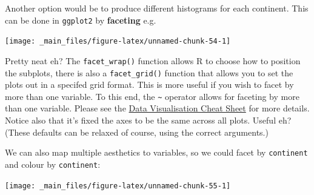 \documentclass[]{book}
\newenvironment{Shaded}{\begin{snugshade}}{\end{snugshade}}
\newcommand{\KeywordTok}[1]{\textcolor[rgb]{0.13,0.29,0.53}{\textbf{{#1}}}}
\newcommand{\DataTypeTok}[1]{\textcolor[rgb]{0.13,0.29,0.53}{{#1}}}
\newcommand{\DecValTok}[1]{\textcolor[rgb]{0.00,0.00,0.81}{{#1}}}
\newcommand{\StringTok}[1]{\textcolor[rgb]{0.31,0.60,0.02}{{#1}}}
\newcommand{\NormalTok}[1]{{#1}}
\theoremstyle{definition}
\theoremstyle{definition}
\theoremstyle{definition}
\theoremstyle{remark}
\begin{document}
Another option would be to produce different histograms for each
continent. This can be done in \texttt{ggplot2} by \textbf{faceting}
e.g.

\begin{Shaded}
\end{Shaded}

\begin{center}\texttt{[image: \_main\_files/figure-latex/unnamed-chunk-54-1]} \end{center}

Pretty neat eh? The \texttt{facet\_wrap()} function allows R to choose
how to position the subplots, there is also a \texttt{facet\_grid()}
function that allows you to set the plots out in a specifed grid format.
This is more useful if you wish to facet by more than one variable. To
this end, the \texttt{\textasciitilde{}} operator allows for faceting by
more than one variable. Please see the
\href{https://www.rstudio.com/wp-content/uploads/2016/11/ggplot2-cheatsheet-2.1.pdf}{Data
Visualisation Cheat Sheet} for more details. Notice also that it's fixed
the axes to be the same across all plots. Useful eh? (These defaults can
be relaxed of course, using the correct arguments.)

We can also map multiple aesthetics to variables, so we could facet by
\texttt{continent} and colour by \texttt{continent}:

\begin{Shaded}
\end{Shaded}

\begin{center}\texttt{[image: \_main\_files/figure-latex/unnamed-chunk-55-1]} \end{center}
\end{document}
